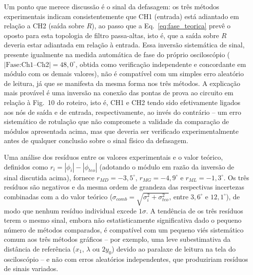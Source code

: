\documentclass[reprint,amsmath,amssymb,aps,prl,floatfix,onecolumn]{revtex4-2}
\begin{document}
Um ponto que merece discussão é o sinal da defasagem: os três métodos experimentais indicam consistentemente que CH1 (entrada) está adiantado em relação a CH2 (saída sobre $R$), ao passo que a Eq.~\eqref{eq:fase_teorica} prevê o oposto para esta topologia de filtro passa-altas, isto é, que a saída sobre $R$ deveria estar adiantada em relação à entrada. Essa inversão sistemática de sinal, presente igualmente na medida automática de fase do próprio osciloscópio ($|\text{Fase:Ch1--Ch2}|=48{,}0^\circ$, obtida como verificação independente e concordante em módulo com os demais valores), não é compatível com um simples erro aleatório de leitura, já que se manifesta da mesma forma nos três métodos. A explicação mais provável é uma inversão na conexão das pontas de prova ao circuito em relação à Fig.~10 do roteiro, isto é, CH1 e CH2 tendo sido efetivamente ligados aos nós de saída e de entrada, respectivamente, ao invés do contrário -- um erro sistemático de rotulação que não compromete a validade da comparação de módulos apresentada acima, mas que deveria ser verificado experimentalmente antes de qualquer conclusão sobre o sinal físico da defasagem.

Uma análise dos resíduos entre os valores experimentais e o valor teórico, definidos como $r_i=|\phi_i|-|\phi_{teo}|$ (adotando o módulo em razão da inversão de sinal discutida acima), fornece $r_{MD}=-3{,}5^\circ$, $r_{MG}=-4{,}9^\circ$ e $r_{ML}=-1{,}3^\circ$. Os três resíduos são negativos e da mesma ordem de grandeza das respectivas incertezas combinadas com a do valor teórico ($\sigma_{comb}=\sqrt{\sigma_i^2+\sigma_{teo}^2}$, entre $3{,}6^\circ$ e $12{,}1^\circ$), de modo que nenhum resíduo individual excede $1\sigma$. A tendência de os três resíduos terem o mesmo sinal, embora não estatisticamente significativa dado o pequeno número de métodos comparados, é compatível com um pequeno viés sistemático comum aos três métodos gráficos -- por exemplo, uma leve subestimativa da distância de referência ($x_1$, $\lambda$ ou $2y_0$) devido ao paralaxe de leitura na tela do osciloscópio -- e não com erros aleatórios independentes, que produziriam resíduos de sinais variados.
\end{document}
